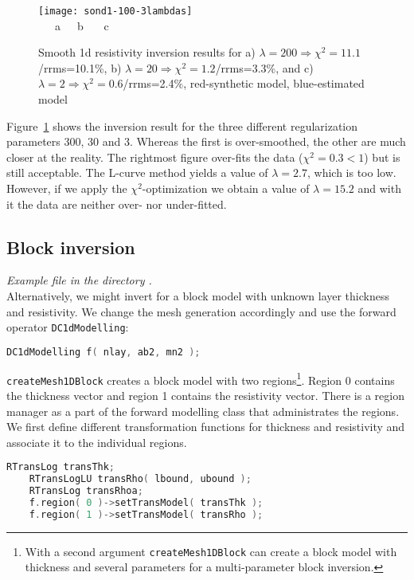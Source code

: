 \begin{figure}[htbp]
\texttt{[image: sond1-100-3lambdas]}\\[-3ex]
~~~a\hfill ~~~b \hfill ~~~c \hfill ~
\caption{Smooth 1d resistivity inversion results for a) $\lambda=200\Rightarrow \chi^2=11.1$/rrms=10.1\%, b) $\lambda=20\Rightarrow \chi^2=1.2$/rrms=3.3\%, and c) $\lambda=2\Rightarrow \chi^2=0.6$/rrms=2.4\%, red-synthetic model, blue-estimated model}\label{fig:dc1d-3lambda}
\end{figure}

Figure~\ref{fig:dc1d-3lambda} shows the inversion result for the three different regularization parameters 300, 30 and 3.
Whereas the first is over-smoothed, the other are much closer at the reality.
The rightmost figure over-fits the data ($\chi^2=0.3<1$) but is still acceptable.
The L-curve method yields a value of $\lambda=2.7$, which is too low.
However, if we apply the $\chi^2$-optimization we obtain a value of $\lambda=15.2$ and with it the data are neither over- nor under-fitted.

\subsection{Block inversion}\label{sec:dc1dblock}
{\em Example file  in the directory .}\\
Alternatively, we might invert for a block model with unknown layer thickness and resistivity.
We change the mesh generation accordingly and use the forward operator \lstinline|DC1dModelling|:
\begin{lstlisting}[language=C++]
    DC1dModelling f( nlay, ab2, mn2 );
\end{lstlisting}

\lstinline|createMesh1DBlock| creates a block model with two regions\footnote{With a second argument \lstinline|createMesh1DBlock| can create a block model with thickness and several parameters for a multi-parameter block inversion.}.
Region 0 contains the thickness vector and region 1 contains the resistivity vector.
There is a region manager as a part of the forward modelling class that administrates the regions.
We first define different transformation functions for thickness and resistivity and associate it to the individual regions.
\begin{lstlisting}[language=C++]
    RTransLog transThk;
    RTransLogLU transRho( lbound, ubound );
    RTransLog transRhoa;
    f.region( 0 )->setTransModel( transThk );
    f.region( 1 )->setTransModel( transRho );
\end{lstlisting}

